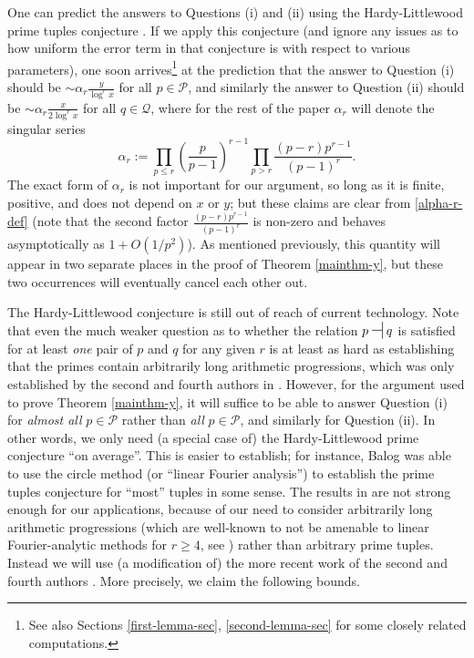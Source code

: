 \documentclass[11pt]{amsart}
\numberwithin{equation}{section}  %
\theoremstyle{remark}
\theoremstyle{plain}
\numberwithin{equation}{section}
\newcommand{\be}{\begin{equation}}
\newcommand{\ee}{\end{equation}}
\renewcommand{\leq}{\leqslant}
\renewcommand{\geq}{\geqslant}
\renewcommand{\(}{\left(}
\renewcommand{\)}{\right)}
\newcommand{\asym}{\sim}   %
\newcommand{\rel}{\nsststile{}{}}  %
\newcommand{\PP}{\mathcal{P}}
\newcommand{\QQ}{\mathcal{Q}}
\begin{document}
One can predict the answers to Questions (i) and (ii) using the Hardy-Littlewood prime tuples conjecture \cite{hl}.  If we apply this conjecture (and ignore any issues as to how uniform the error term in that conjecture is with respect to various parameters), one soon arrives\footnote{See also Sections \ref{first-lemma-sec}, \ref{second-lemma-sec} for some closely related computations.} at the prediction that the answer to Question (i) should be $\asym\alpha_r \frac{y}{\log^r x}$ for all $p \in \PP$, and similarly the answer to Question (ii) should be $\asym \alpha_r \frac{x}{2\log^r x}$ for all $q \in \QQ$, where for the rest of the paper $\alpha_r$ will denote the singular series
\be\label{alpha-r-def}
 \alpha_r := \prod_{p \leq r} \left(\frac{p}{p-1}\right)^{r - 1} \prod_{p > r}\frac{(p-r)p^{r-1}}{(p-1)^r}.
\ee
The exact form of $\alpha_r$ is not important for our argument, so long as it is finite, positive, and does not depend on $x$ or $y$; but these claims are clear from \eqref{alpha-r-def} (note that the second factor $\frac{(p-r)p^{r-1}}{(p-1)^r}$ is non-zero and behaves asymptotically as $1+O(1/p^2)$).  As mentioned previously, this quantity will appear in two separate places in the proof of Theorem \ref{mainthm-y}, but these two occurrences will eventually cancel each other out. 

The Hardy-Littlewood conjecture is still out of reach of current technology.  Note that even the much weaker question as to whether the relation $p \rel q$ is satisfied for at least \emph{one} pair of $p$ and $q$ for any given $r$ is at least as hard as establishing that the primes contain arbitrarily long arithmetic progressions, which was only established by the second and fourth authors in \cite{gt-thm}.  However, for the argument used to prove Theorem \ref{mainthm-y}, it will suffice to be able to answer Question (i) for \emph{almost all} $p \in \PP$ rather than \emph{all} $p \in \PP$, and similarly for Question (ii).  In other words, we only need (a special case of) the Hardy-Littlewood prime conjecture ``on average''.  This is easier to establish; for instance, Balog \cite{balog} was able to use the circle method (or ``linear Fourier analysis'') to establish the prime tuples conjecture for ``most'' tuples in some sense.  The results in \cite{balog} are not strong enough for our applications, because of our need to consider arbitrarily long arithmetic progressions (which are well-known to not be amenable to linear Fourier-analytic methods for $r \geq 4$, see \cite{gowers-4}) rather than arbitrary prime tuples.  Instead we will use (a modification of) the more recent work of the second and fourth authors \cite{gt-linearprimes}.   More precisely, we claim the following bounds.
\end{document}

